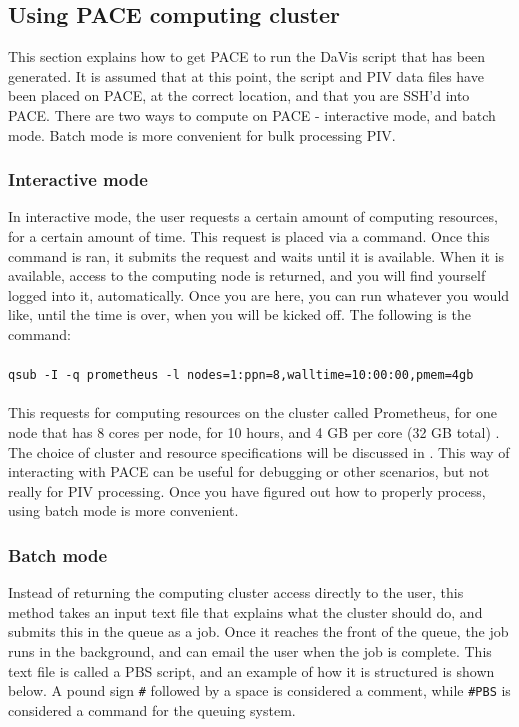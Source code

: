 \documentclass{article}
\begin{document}
	\subsection{Using PACE computing cluster}
	This section explains how to get PACE to run the DaVis script that has been generated.  It is assumed that at this point, the script and PIV data files have been placed on PACE, at the correct location, and that you are SSH'd into PACE.  There are two ways to compute on PACE - interactive mode, and batch mode.  Batch mode is more convenient for bulk processing PIV.
	
	\subsubsection{Interactive mode}
	In interactive mode, the user requests a certain amount of computing resources, for a certain amount of time.  This request is placed via a command.  Once this command is ran, it submits the request and waits until it is available.  When it is available, access to the computing node is returned, and you will find yourself logged into it, automatically.  Once you are here, you can run whatever you would like, until the time is over, when you will be kicked off.  The following is the command:
	\\ \\
	\texttt{qsub -I -q prometheus -l nodes=1:ppn=8,walltime=10:00:00,pmem=4gb}
	\\  \\
	This requests for computing resources on the cluster called Prometheus, for one node that has 8 cores per node, for 10 hours, and 4 GB per core (32 GB total) .  The choice of cluster and resource specifications will be discussed in .  This way of interacting with PACE can be useful for debugging or other scenarios, but not really for PIV processing.  Once you have figured out how to properly process, using batch mode is more convenient.
	
	\subsubsection{Batch mode}
	Instead of returning the computing cluster access directly to the user, this method takes an input text file that explains what the cluster should do, and submits this in the queue as a job.  Once it reaches the front of the queue, the job runs in the background, and can email the user when the job is complete.  This text file is called  a PBS script, and an example of how it is structured is shown below.  A pound sign \texttt{\#} followed by a space is considered a comment, while \texttt{\#PBS} is considered a command for the queuing system.
	
\end{document}
